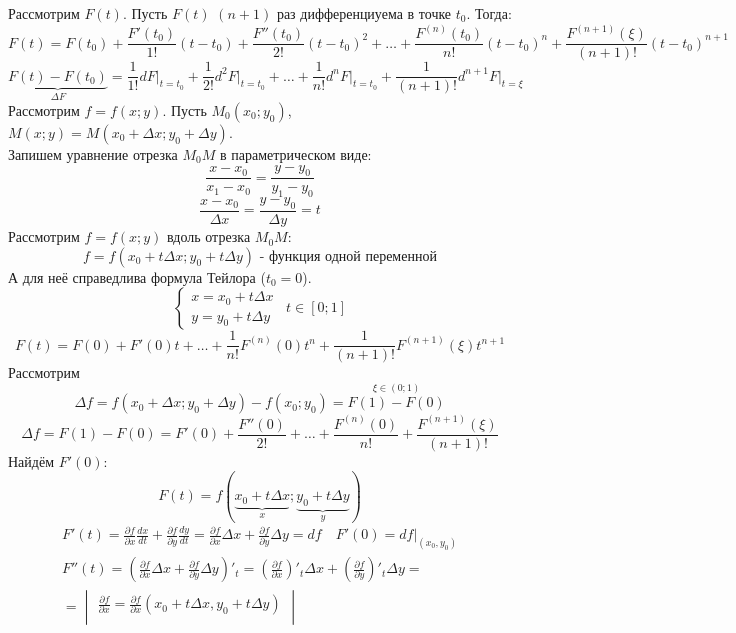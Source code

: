 \documentclass[12pt]{article}
\begin{document}
    \begin{adjustwidth}{1.5em}{1.5em}
        Рассмотрим $F(t)$. Пусть $F(t)$ $(n + 1)$ раз дифференциуема в точке $t_0$. Тогда:
        \[ F(t) = F(t_0) + \frac{F'(t_0)}{1!}(t-t_0) + \frac{F''(t_0)}{2!}(t-t_0)^2 + \dots + \frac{F^{(n)}(t_0)}{n!}(t-t_0)^n + \frac{F^{(n+1)}(\xi)}{(n+1)!}(t-t_0)^{n+1} \]
        \[ \underbrace{F(t) - F(t_0)}_{\Delta F} = \frac{1}{1!}dF\Big|_{t=t_0} + \frac{1}{2!}d^2F\Big|_{t=t_0} + \dots + \frac{1}{n!}d^nF\Big|_{t=t_0} + \frac{1}{(n+1)!}d^{n+1}F\Big|_{t=\xi} \]
        Рассмотрим $f = f(x; y)$. Пусть $M_0(x_0; y_0)$, $M(x; y) = M(x_0 + \Delta x; y_0 + \Delta y)$.\\
        Запишем уравнение отрезка $M_0M$ в параметрическом виде:
        \[ \frac{x - x_0}{x_1 - x_0} = \frac{y - y_0}{y_1 - y_0} \]
        \[ \frac{x - x_0}{\Delta x} = \frac{y - y_0}{\Delta y} = t \]
        Рассмотрим $f = f(x; y)$ вдоль отрезка $M_0M$:
        \[ f = f(x_0 + t \Delta x; y_0 + t \Delta y) \text{ - функция одной переменной} \]
        А для неё справедлива формула Тейлора ($t_0 = 0$).
        \[ \begin{cases}
            x = x_0 + t \Delta x\\
            y = y_0 + t \Delta y
        \end{cases}\,\,\, t \in [0; 1] \]
        \[ F(t) = F(0) + F'(0)t + \dots + \frac{1}{n!}F^{(n)}(0)t^n + \frac{1}{(n+1)!}F^{(n+1)}(\xi)t^{n+1} \]
        Рассмотрим
        \[ \Delta f = f(x_0 + \Delta x; y_0 + \Delta y) - f(x_0; y_0) = \overset{\xi \in (0; 1)}{F(1) - F(0)} \]
        \[ \Delta f = F(1) - F(0) = F'(0) + \frac{F''(0)}{2!} + \dots + \frac{F^{(n)}(0)}{n!} + \frac{F^{(n+1)}(\xi)}{(n+1)!} \]
        Найдём $F'(0)$:
        \[ F(t) = f(\underbrace{x_0 + t\Delta x}_{x}; \underbrace{y_0 + t\Delta y}_{y}) \]
        \begin{gather*}
            F'(t)=\frac{\partial f}{\partial x} \frac{d x}{d t}+\frac{\partial f}{\partial y} \frac{d y}{d t}=\frac{\partial f}{\partial x} \Delta x+\frac{\partial f}{\partial y} \Delta y=d f \quad F'(0)=d f \Big|_{(x_0, y_0)} \\
            F''(t)=\left(\frac{\partial f}{\partial x} \Delta x+\frac{\partial f}{\partial y} \Delta y\right)'_t =\left(\frac{\partial f}{\partial x}\right)'_t \Delta x+\left(\frac{\partial f}{\partial y}\right)'_t \Delta y= \\
            =\begin{vmatrix}
                \frac{\partial f}{\partial x}=\frac{\partial f}{\partial x}\left(x_0+t\Delta x, y_0+t \Delta y\right)\\

\end{vmatrix}
\end{gather*}
\end{adjustwidth}
\end{document}
